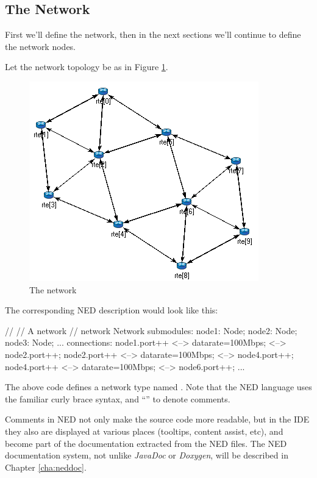 \subsection{The Network}
\label{sec:ch-ned-lang:warmup:network}

First we'll define the network, then in the next sections we'll continue
to define the network nodes.

Let the network topology be as in Figure \ref{fig:ned-routing-topology}.

\begin{figure}[htbp]
  \centering
  \includegraphics[scale=0.6]{figures/ned-routing-network}
  \caption{The network}
  \label{fig:ned-routing-topology}
\end{figure}

The corresponding NED description would look like this:

\begin{ned}
//
// A network
//
network Network
{
    submodules:
        node1: Node;
        node2: Node;
        node3: Node;
        ...
    connections:
        node1.port++ <--> {datarate=100Mbps;} <--> node2.port++;
        node2.port++ <--> {datarate=100Mbps;} <--> node4.port++;
        node4.port++ <--> {datarate=100Mbps;} <--> node6.port++;
        ...
}
\end{ned}

The above code defines a network type named . Note that the NED
language uses the familiar curly brace syntax, and ``\ttt{//}'' to denote
comments.

\begin{note}
    Comments in NED not only make the source code more readable, but in the
    {\opp} IDE they also are displayed at various places (tooltips, content
    assist, etc), and become part of the documentation extracted from the NED
    files. The NED documentation system, not unlike \textit{JavaDoc} or
    \textit{Doxygen}, will be described in Chapter \ref{cha:neddoc}.
\end{note}

